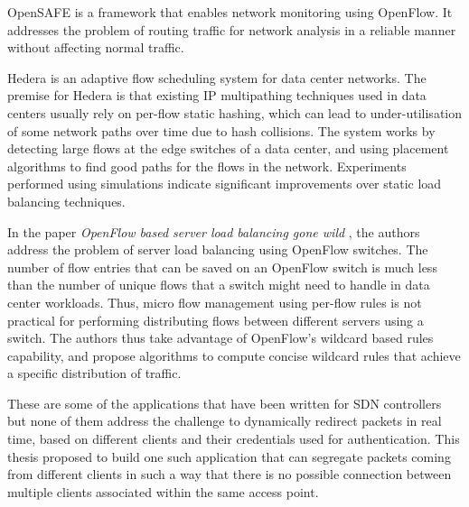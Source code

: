 OpenSAFE \cite{ballard2010extensible} is a framework that enables network monitoring using OpenFlow. It addresses the problem of routing traffic for network analysis in a reliable manner without affecting normal traffic. 

Hedera \cite{al2010hedera} is an adaptive flow scheduling system for data center networks. The premise for Hedera is that existing IP multipathing techniques used in data centers usually rely on per-flow static hashing, which can lead to under-utilisation of some network paths over time due to hash collisions. The system works by detecting large flows at the edge switches of a data center, and using placement algorithms to find good paths for the flows in the network. Experiments performed using simulations indicate significant improvements over static load balancing techniques. 

In the paper \textit{OpenFlow based server load balancing gone wild} \cite{wang2011openflow}, the authors address the problem of server load balancing using OpenFlow switches. The number of flow entries that can be saved on an OpenFlow switch is much less than the number of unique flows that a switch might need to handle in data center workloads. Thus, micro flow management using per-flow rules is not practical for performing distributing flows between different servers using a switch. The authors thus take advantage of OpenFlow’s wildcard based rules capability, and propose algorithms to compute concise wildcard rules that achieve a specific distribution of traffic.

These are some of the applications that have been written for SDN controllers but none of them address the challenge to dynamically redirect packets in real time, based on different clients and their credentials used for authentication. This thesis proposed to build one such application that can segregate packets coming from different clients in such a way that there is no possible connection between multiple clients associated within the same access point.



